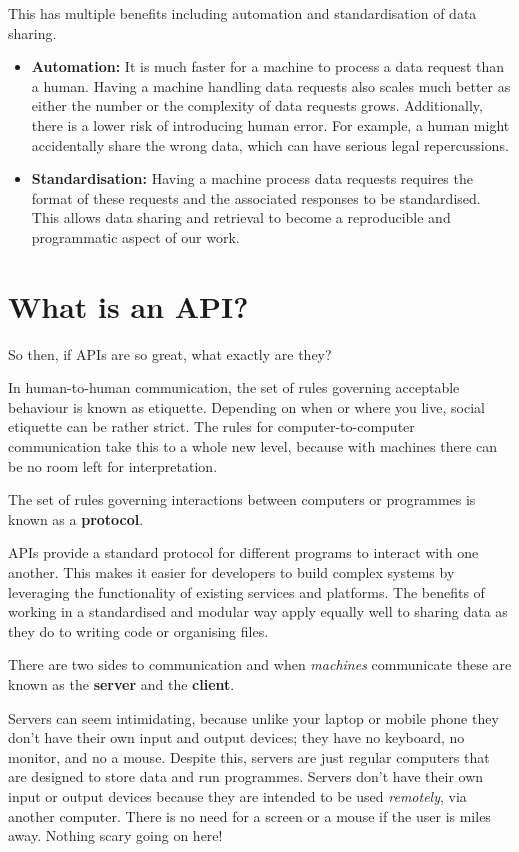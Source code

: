 \documentclass[
  12pt,
]{book}
\begin{document}
This has multiple benefits including automation and standardisation of data sharing.

\begin{itemize}
\item
  \textbf{Automation:} It is much faster for a machine to process a data request than a human. Having a machine handling data requests also scales much better as either the number or the complexity of data requests grows. Additionally, there is a lower risk of introducing human error. For example, a human might accidentally share the wrong data, which can have serious legal repercussions.
\item
  \textbf{Standardisation:} Having a machine process data requests requires the format of these requests and the associated responses to be standardised. This allows data sharing and retrieval to become a reproducible and programmatic aspect of our work.
\end{itemize}

\hypertarget{what-is-an-api}{%
\section{What is an API?}\label{what-is-an-api}}

So then, if APIs are so great, what exactly are they?

In human-to-human communication, the set of rules governing acceptable behaviour is known as etiquette. Depending on when or where you live, social etiquette can be rather strict. The rules for computer-to-computer communication take this to a whole new level, because with machines there can be no room left for interpretation.

The set of rules governing interactions between computers or programmes is known as a \textbf{protocol}.

APIs provide a standard protocol for different programs to interact with one another. This makes it easier for developers to build complex systems by leveraging the functionality of existing services and platforms. The benefits of working in a standardised and modular way apply equally well to sharing data as they do to writing code or organising files.

There are two sides to communication and when \emph{machines} communicate these are known as the \textbf{server} and the \textbf{client}.

Servers can seem intimidating, because unlike your laptop or mobile phone they don't have their own input and output devices; they have no keyboard, no monitor, and no a mouse. Despite this, servers are just regular computers that are designed to store data and run programmes. Servers don't have their own input or output devices because they are intended to be used \emph{remotely}, via another computer. There is no need for a screen or a mouse if the user is miles away. Nothing scary going on here!
\end{document}
